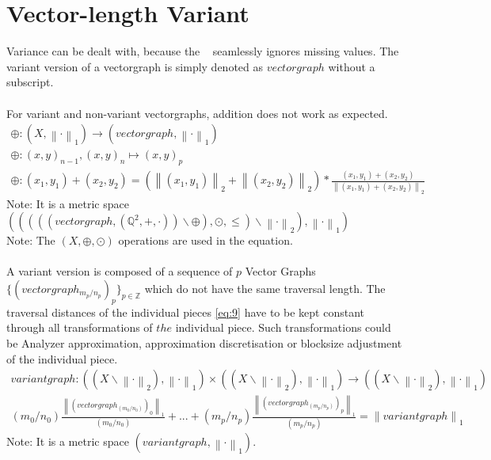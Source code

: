 \documentclass{report}
\newcommand\norm[1]{\left\lVert#1\right\rVert}
\begin{document}
\chapter{Vector-length Variant}
Variance can be dealt with, because the ~\cite[Stopeight\_Analyzer.tex]{Analyzer} seamlessly ignores missing values. The variant version of a vectorgraph is simply denoted as $vectorgraph$ without a subscript.\\\\
For variant and non-variant vectorgraphs, addition does not work as expected.
\begin{align}
\oplus : (X, \norm{\cdot}_1) \rightarrow (vectorgraph, \norm{\cdot}_1)\\
\oplus : (x,y)_{n-1},(x,y)_{n}\mapsto (x,y)_{p}\\
\oplus : (x_{1},y_{1})+(x_{2},y_{2})=(\norm{(x_{1},y_{1})}_2+\norm{(x_{2},y_{2})}_2)*\frac{(x_{1},y_{1})+(x_{2},y_{2})}{\norm{(x_{1},y_{1})+(x_{2},y_{2})}_{2}}
\end{align}
Note: It is a metric space $(((((vectorgraph,(\mathbb{Q}^2,+,\cdot))\backslash\oplus),\odot,\leq)\backslash\norm{\cdot}_2), \norm{\cdot}_1)$\\
Note: The $(X,\oplus,\odot)$ operations are used in the equation.\\\\
A variant version is composed of a sequence of $p$ Vector Graphs $\{(vectorgraph_{m_{p}/n_{p}})_{p}\}_{p\in \mathbb{Z}}$ which do not have the same traversal length. The traversal distances of the individual pieces \eqref{eq:9} have to be kept constant through all transformations of $the$ individual piece. Such transformations could be Analyzer approximation, approximation discretisation or blocksize adjustment of the individual piece.
\begin{align}
variantgraph: ((X\backslash\norm{\cdot}_2),\norm{\cdot}_1)\times ((X\backslash\norm{\cdot}_2),\norm{\cdot}_1) \rightarrow ((X\backslash\norm{\cdot}_2),\norm{\cdot}_1)\\
(m_{0}/n_{0})\frac{\norm{(vectorgraph_{(m_{0}/n_{0})})_{0}}_{1}}{(m_{0}/n_{0})}+...+(m_{p}/n_{p})\frac{\norm{(vectorgraph_{(m_{p}/n_{p})})_{p}}_{1}}{(m_{p}/n_{p})}=\norm{variantgraph}_1
\end{align}
Note: It is a metric space $(variantgraph, \norm{\cdot}_1)$.
\end{document}

